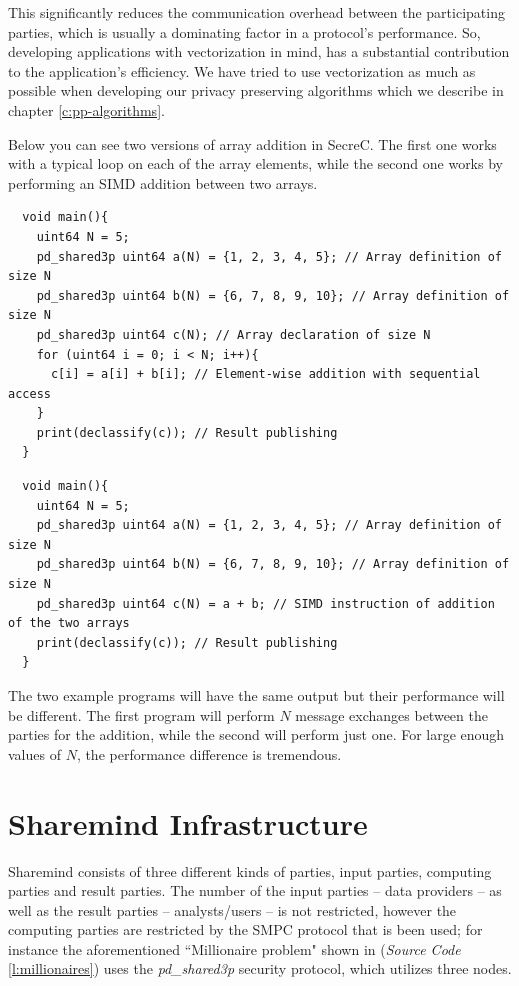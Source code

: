 This significantly reduces the communication overhead between the participating parties, which is usually a dominating factor in a protocol's performance.
So, developing applications with vectorization in mind, has a substantial contribution to the application's efficiency.
We have tried to use vectorization as much as possible when developing our privacy preserving algorithms which we describe in chapter \ref{c:pp-algorithms}.

Below you can see two versions of array addition in SecreC.
The first one works with a typical loop on each of the array elements, while the second one works by performing an SIMD addition between two arrays.

{
\begin{verbatim}
  void main(){
    uint64 N = 5;
    pd_shared3p uint64 a(N) = {1, 2, 3, 4, 5}; // Array definition of size N
    pd_shared3p uint64 b(N) = {6, 7, 8, 9, 10}; // Array definition of size N
    pd_shared3p uint64 c(N); // Array declaration of size N
    for (uint64 i = 0; i < N; i++){
      c[i] = a[i] + b[i]; // Element-wise addition with sequential access
    }
    print(declassify(c)); // Result publishing
  }
\end{verbatim}
\label{l:non_vectorized_addition}
}

{
\begin{verbatim}
  void main(){
    uint64 N = 5;
    pd_shared3p uint64 a(N) = {1, 2, 3, 4, 5}; // Array definition of size N
    pd_shared3p uint64 b(N) = {6, 7, 8, 9, 10}; // Array definition of size N
    pd_shared3p uint64 c(N) = a + b; // SIMD instruction of addition of the two arrays
    print(declassify(c)); // Result publishing
  }
\end{verbatim}
\label{l:vectorized_addition}
}

The two example programs will have the same output but their performance will be different. The first program will perform $N$ message exchanges between the parties for the addition, while the second will perform just one.
For large enough values of $N$, the performance difference is tremendous.

\section{Sharemind Infrastructure}\label{sharemind-infrastructure}
Sharemind consists of three different kinds of parties, input parties, computing parties and result parties.
The number of the input parties -- data providers -- as well as the result parties -- analysts/users -- is not restricted, however the computing parties are restricted by the SMPC protocol that is been used; for instance the aforementioned ``Millionaire problem" shown in (\textit{Source Code} \ref{l:millionaires}) uses the \textit{pd\_shared3p} security protocol, which utilizes three nodes.

